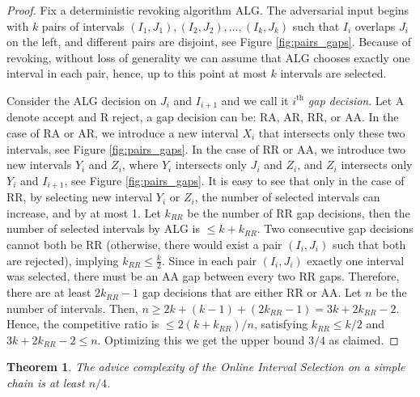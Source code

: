 \documentclass[reqno,11pt]{article} %
\newtheorem{theorem}{Theorem}
\theoremstyle{remark}
\newcommand{\ALG}{\textsc{ALG}\xspace}
\begin{document}
\begin{proof}
    Fix a deterministic revoking algorithm \ALG. The adversarial input begins with $k$ pairs of intervals $(I_1, J_1), (I_2, J_2), \ldots, (I_k, J_k)$ such that $I_i$ overlaps $J_i$ on the left, and different pairs are disjoint, see Figure \ref{fig:pairs_gaps}. Because of revoking, without loss of generality we can assume that \ALG chooses exactly one interval in each pair, hence, up to this point at most $k$ intervals are selected.

Consider the \ALG decision on $J_i$ and $I_{i+1}$ and we call it $i^\text{th}$ \textit{gap decision}. 
Let A denote accept and R reject,  a gap decision can be: RA, AR, RR, or AA. In the case of RA or AR, we introduce a new interval $X_i$ that intersects only these two intervals, see Figure \ref{fig:pairs_gaps}. In the case of RR or AA, we introduce two new intervals $Y_i$ and $Z_i$, where $Y_i$ intersects only $J_i$ and $Z_i$, and $Z_i$ intersects only $Y_i$ and $I_{i+1}$, see Figure \ref{fig:pairs_gaps}. It is easy to see that only in the case of RR, by selecting new interval $Y_i$ or $Z_i$, the number of selected intervals can increase, and by at most 1. Let $k_{RR}$ be the number of RR gap decisions, then the number of selected intervals by \ALG is $\le k + k_{RR}$. Two consecutive gap decisions cannot both be RR (otherwise, there would exist a pair $(I_i, J_i)$ such that both are rejected), implying $k_{RR} \leq \frac{k}{2}$. Since in each pair $(I_i, J_i)$ exactly one interval was selected, there must be an AA gap between every two RR gaps. Therefore, there are at least $2k_{RR} - 1$ gap decisions that are either RR or AA.
Let $n$ be the number of intervals. Then, 
	$n \ge 2k+(k-1)+(2k_{RR} -1) = 3k + 2k_{RR} - 2$.
Hence, the competitive ratio is 
	$\le 2(k+k_{RR})/n$,
satisfying
	$k_{RR} \le k/2$ and $3k + 2k_{RR} -2 \leq n$.
Optimizing this we get the upper bound $3/4$ as claimed. 
\end{proof}










\begin{theorem}
\label{thm:advice_lb}
    The advice complexity of  the Online Interval Selection on a simple chain is at least $n/4$.
\end{theorem}
 
\end{document}
